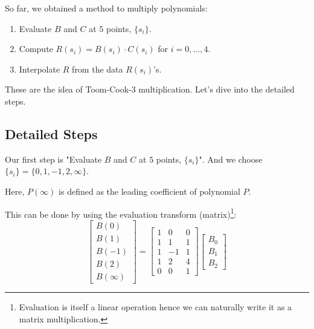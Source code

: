 \documentclass[
11pt,notheorems,hyperref={pdfauthor=whatever}
]{beamer}
\begin{document}
\begin{frame}
    So far, we obtained a method to multiply polynomials:
    \begin{enumerate}
        \item Evaluate $B$ and $C$ at $5$ points,  $\{ s_{i} \}$.
        \item Compute $R(s_{i}) = B(s_{i}) \cdot C(s_{i})$ for $i=0,...,4$.
        \item Interpolate $R$ from the data $R(s_{i})$'s.
    \end{enumerate}

    These are the idea of Toom-Cook-3 multiplication.
    Let's dive into the detailed steps.
\end{frame}


\subsection{Detailed Steps}

\begin{frame}
    Our first step is "Evaluate $B$ and $C$ at $5$ points, $\{ s_{i} \}$".
    And we choose $\{s_{i}\} = \{0,1,-1,2,\infty\}$.

    Here, $P(\infty)$ is defined as the leading coefficient of polynomial $P$.

    This can be done by using the evaluation transform (matrix)\footnote[]{Evaluation is itself a linear operation hence we can naturally write it as a matrix multiplication.}:
    \[
    \left[\begin{array}{l}
    B(0) \\
    B(1) \\
    B(-1) \\
    B(2) \\
    B(\infty)
    \end{array}\right]=\left[\begin{array}{ccc}
    1 & 0 & 0 \\
    1 & 1 & 1 \\
    1 & -1 & 1 \\
    1 & 2 & 4 \\
    0 & 0 & 1
    \end{array}\right]\left[\begin{array}{l}
    B_0 \\
    B_1 \\
    B_2
    \end{array}\right]
    \]
\end{frame}
\end{document}
